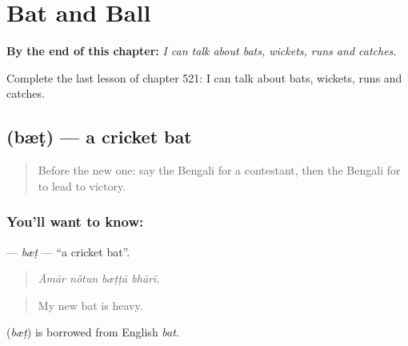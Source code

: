 
\chapter{Bat and Ball}
\label{ch:bn-bat-and-ball}

\begin{chapteropening}
\textbf{By the end of this chapter:} \emph{I can talk about bats, wickets, runs and catches.}

Complete the last lesson of chapter 521: I can talk about bats, wickets, runs and catches.
\end{chapteropening}

\section[\texorpdfstring{\bn{ব্যাট} (bæṭ)}{ব্যাট (bæṭ)}]{ (bæṭ) — a cricket bat}

\label{lesson:BN-C521-bet}



\begin{quote}
Before the new one: say the Bengali for a contestant, then the Bengali for to lead to victory.
\end{quote}

\subsection*{You'll want to know: }
\textbf{} — \emph{bæṭ} — \textquotedblleft{}a cricket bat\textquotedblright{}.

\begin{quote}
   
\end{quote}

\begin{quote}
\emph{Āmār nôtun bæṭṭā bhārī.}
\end{quote}

\begin{quote}
My new bat is heavy.
\end{quote}

\begin{cousinweb}
\textbf{} (\emph{bæṭ}) is borrowed from English \emph{bat}.
\end{cousinweb}

